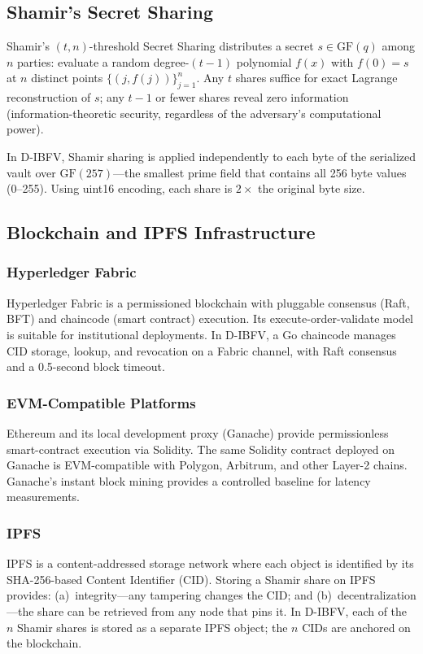 \subsection{Shamir's Secret Sharing}
\label{sec:shamir_prelim}

Shamir's $(t,n)$-threshold Secret Sharing \cite{shamir1979how} distributes a secret
$s \in \mathrm{GF}(q)$ among $n$ parties: evaluate a random degree-$(t{-}1)$
polynomial $f(x)$ with $f(0) = s$ at $n$ distinct points $\{(j, f(j))\}_{j=1}^n$.
Any $t$ shares suffice for exact Lagrange reconstruction of $s$; any $t{-}1$ or
fewer shares reveal zero information (information-theoretic security, regardless of
the adversary's computational power).

In D-IBFV, Shamir sharing is applied independently to each byte of the serialized
vault over $\mathrm{GF}(257)$---the smallest prime field that contains all 256 byte
values (0--255). Using uint16 encoding, each share is $2 \times$ the original
byte size.

\subsection{Blockchain and IPFS Infrastructure}
\label{sec:bc_ipfs_prelim}

\subsubsection{Hyperledger Fabric}
Hyperledger Fabric \cite{androulaki2018hyperledger} is a permissioned blockchain
with pluggable consensus (Raft, BFT) and chaincode (smart contract) execution.
Its execute-order-validate model is suitable for institutional deployments.
In D-IBFV, a Go chaincode manages CID storage, lookup, and revocation on a
Fabric channel, with Raft consensus and a 0.5-second block timeout.

\subsubsection{EVM-Compatible Platforms}
Ethereum \cite{buterin2014ethereum} and its local development proxy (Ganache)
provide permissionless smart-contract execution via Solidity. The same Solidity
contract deployed on Ganache is EVM-compatible with Polygon, Arbitrum, and other
Layer-2 chains. Ganache's instant block mining provides a controlled baseline for
latency measurements.

\subsubsection{IPFS}
IPFS \cite{benet2014ipfs} is a content-addressed storage network where each object
is identified by its SHA-256-based Content Identifier (CID). Storing a Shamir
share on IPFS provides: (a)~integrity---any tampering changes the CID; and
(b)~decentralization---the share can be retrieved from any node that pins it.
In D-IBFV, each of the $n$ Shamir shares is stored as a separate IPFS object;
the $n$ CIDs are anchored on the blockchain.

